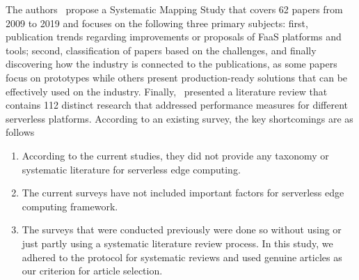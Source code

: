 The authors~\cite{yussupov2019systematic-26} propose a Systematic Mapping Study that covers 62 papers from 2009 to 2019 and focuses on the following three primary subjects: first, publication trends regarding improvements or proposals of FaaS platforms and tools; second, classification of papers based on the challenges, and finally discovering how the industry is connected to the publications, as some papers focus on prototypes while others present production-ready solutions that can be effectively used on the industry. Finally,~\cite {scheuner2020function-27} presented a literature review that contains 112 distinct research that addressed performance measures for different serverless platforms.
 According to an  existing survey, the key shortcomings are  as follows
 \begin{enumerate}
     \item  According to the current studies, they did not provide any taxonomy or systematic literature for serverless edge computing.
     \item The current surveys have not included important factors for serverless edge computing framework.
     \item The surveys that were conducted previously were done so without using or just partly using a systematic literature review process. In this study, we adhered to the protocol for systematic reviews and used genuine articles as our criterion for article selection.
 \end{enumerate}